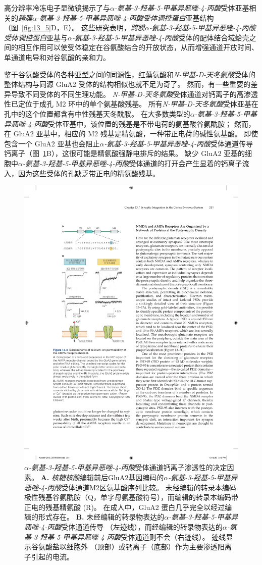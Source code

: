 高分辨率冷冻电子显微镜揭示了与\textit{$\alpha$-氨基-3-羟基-5-甲基异恶唑-4-丙酸}受体亚基相关的\textit{跨膜$\alpha$-氨基-3-羟基-5-甲基异恶唑-4-丙酸受体调控蛋白}亚基结构（图~\ref{fig:13_5}D，E）。
这些研究表明，\textit{跨膜$\alpha$-氨基-3-羟基-5-甲基异恶唑-4-丙酸受体调控蛋白}亚基与\textit{$\alpha$-氨基-3-羟基-5-甲基异恶唑-4-丙酸}受体的配体结合域蛤壳之间的相互作用可以使受体稳定在谷氨酸结合的开放状态，从而增强通道开放时间、单通道电导和对谷氨酸的亲和力。


鉴于谷氨酸受体的各种亚型之间的同源性，红藻氨酸和\textit{N-甲基-D-天冬氨酸}受体的整体结构与同源 GluA2 受体的结构相似也就不足为奇了。
然而，有一些重要的差异导致不同受体的不同生理功能。 
\textit{N-甲基-D-天冬氨酸}受体通道对钙离子的高渗透性已定位于成孔 M2 环中的单个氨基酸残基。
所有\textit{N-甲基-D-天冬氨酸}受体亚基在孔中的这个位置都含有中性残基天冬酰胺。
在大多数类型的\textit{$\alpha$-氨基-3-羟基-5-甲基异恶唑-4-丙酸}受体亚基中，该位置的残基是不带电荷的氨基酸谷氨酰胺；
然而，在 GluA2 亚基中，相应的 M2 残基是精氨酸，一种带正电荷的碱性氨基酸。
即使包含一个 GluA2 亚基也会阻止\textit{$\alpha$-氨基-3-羟基-5-甲基异恶唑-4-丙酸}受体通道传导钙离子（图~\ref{fig:13_6}B），这很可能是精氨酸强静电排斥的结果。
缺少 GluA2 亚基的细胞中\textit{$\alpha$-氨基-3-羟基-5-甲基异恶唑-4-丙酸}受体通道的打开会产生显着的钙离子流入，因为这些受体的孔缺乏带正电的精氨酸残基。


\begin{figure}[htbp]
	\centering
	\includegraphics[width=0.5\linewidth]{chap13/fig_13_6}
	\caption{\textit{$\alpha$-氨基-3-羟基-5-甲基异恶唑-4-丙酸}受体通道钙离子渗透性的决定因素。
		\textbf{A.} \textit{核糖核酸}编辑前后GluA2基因编码的\textit{$\alpha$-氨基-3-羟基-5-甲基异恶唑-4-丙酸}受体通道M2区氨基酸序列比较。
		未经编辑的转录本编码极性残基谷氨酰胺（Q，单字母氨基酸符号），而编辑的转录本编码带正电的残基精氨酸 (R)。
		在成人中，GluA2 蛋白几乎完全以经过编辑的形式存在。
		\textbf{B.} 未经编辑的转录物表达的\textit{$\alpha$-氨基-3-羟基-5-甲基异恶唑-4-丙酸}受体通道传导 （左迹线），而经编辑的转录物表达的\textit{$\alpha$-氨基-3-羟基-5-甲基异恶唑-4-丙酸}受体通道则不会（右迹线）。
		迹线显示谷氨酸盐以细胞外 （顶部）或钙离子（底部）作为主要渗透阳离子引起的电流\cite{sakmann1992nobel}。}
	\label{fig:13_6}
\end{figure}


